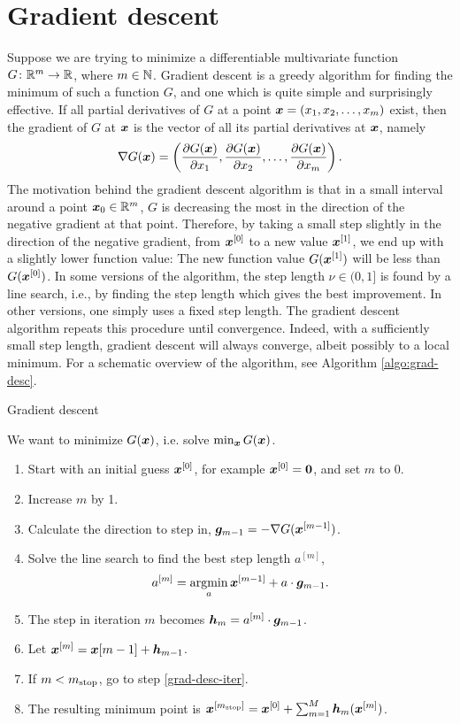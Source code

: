 \section{Gradient descent}
Suppose we are trying to minimize a differentiable multivariate function $G\colon\mathbb{R}^m\to\mathbb{R}$, where $m\in\mathbb{N}$. Gradient descent is a greedy algorithm for finding the minimum of such a function $G$, and one which is quite simple and surprisingly effective. If all partial derivatives of $G$ at a point $\bm{x}=(x_1,x_2,\ldots,x_m)$ exist, then the gradient of $G$ at $\bm{x}$ is the vector of all its partial derivatives at $\bm{x}$, namely
\begin{equation}
    \nabla G(\bm{x})=\left(\frac{\partial G(\bm{x})}{\partial x_1},\frac{\partial G(\bm{x})}{\partial x_2},\ldots,\frac{\partial G(\bm{x})}{\partial x_m}\right).
\end{equation}
The motivation behind the gradient descent algorithm is that in a small interval around a point $\bm{x}_0\in\mathbb{R}^m$, $G$ is decreasing the most in the direction of the negative gradient at that point. Therefore, by taking a small step slightly in the direction of the negative gradient, from $\bm{x}^{[0]}$ to a new value $\bm{x}^{[1]}$, we end up with a slightly lower function value: The new function value $G(\bm{x}^{[1]})$ will be less than $G(\bm{x}^{[0]})$. In some versions of the algorithm, the step length $\nu\in(0,1]$ is found by a line search, i.e., by finding the step length which gives the best improvement. In other versions, one simply uses a fixed step length. The gradient descent algorithm repeats this procedure until convergence. Indeed, with a sufficiently small step length, gradient descent will always converge, albeit possibly to a local minimum. For a schematic overview of the algorithm, see Algorithm \ref{algo:grad-desc}.
\begin{algorithm}
\caption{Gradient descent}
\label{algo:grad-desc}
We want to minimize $G(\bm{x})$, i.e. solve $\min_{\bm{x}}G(\bm{x})$.
\begin{enumerate}
    \item Start with an initial guess $\bm{x}^{[0]}$, for example $\bm{x}^{[0]}=\bm{0}$, and set $m$ to 0.
    \item\label{grad-desc-iter} Increase $m$ by 1.
    \item Calculate the direction to step in, $\bm{g}_{m-1}=-\nabla G(\bm{x}^{[m-1]})$.
    \item Solve the line search to find the best step length $a^{[m]}$,
        \begin{equation*}
            a^{[m]}=\operatorname*{argmin}_{a}\bm{x}^{[m-1]}+a\cdot\bm{g}_{m-1}.
        \end{equation*}
    \item The step in iteration $m$ becomes $\bm{h}_m=a^{[m]}\cdot\bm{g}_{m-1}$.
    \item Let $\bm{x}^{[m]}=\bm{x}{[m-1]}+\bm{h}_{m-1}$.
    \item If $m<m_{\text{stop}}$, go to step \eqref{grad-desc-iter}.
    \item The resulting minimum point is $\bm{x}^{[m_{\text{stop}}]}=\bm{x}^{[0]}+\sum_{m=1}^M\bm{h}_m(\bm{x}^{[m]})$.
\end{enumerate}
\end{algorithm}
